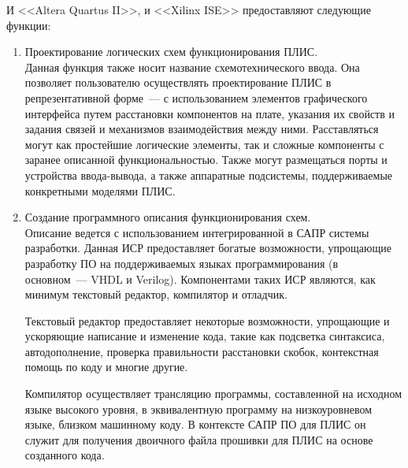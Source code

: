 И <<Altera Quartus II>>, и <<Xilinx ISE>> предоставляют следующие функции:
\begin{enumerate}
  \item Проектирование логических схем функционирования ПЛИС.\\
  Данная функция также носит название схемотехнического ввода.
  Она позволяет пользователю осуществлять проектирование ПЛИС в репрезентативной форме~--- с использованием элементов графического интерфейса путем расстановки компонентов на плате, указания их свойств и задания связей и механизмов взаимодействия между ними.
  Расставляться могут как простейшие логические элементы, так и сложные компоненты с заранее описанной функциональностью.
  Также могут размещаться порты и устройства ввода-вывода, а также аппаратные подсистемы, поддерживаемые конкретными моделями ПЛИС.
  \item Создание программного описания функционирования схем.\\
  Описание ведется с использованием интегрированной в САПР системы разработки.
  Данная ИСР предоставляет богатые возможности, упрощающие разработку ПО на поддерживаемых языках программирования (в основном~--- VHDL и Verilog).
  Компонентами таких ИСР являются, как минимум текстовый редактор, компилятор и отладчик.

  Текстовый редактор предоставляет некоторые возможности, упрощающие и ускоряющие написание и изменение кода, такие как подсветка синтаксиса, автодополнение, проверка правильности расстановки скобок, контекстная помощь по коду и многие другие.

  Компилятор осуществляет трансляцию программы, составленной на исходном языке высокого уровня, в эквивалентную программу на низкоуровневом языке, близком машинному коду.
  В контексте САПР ПО для ПЛИС он служит для получения двоичного файла прошивки для ПЛИС на основе созданного кода.


\end{enumerate}
